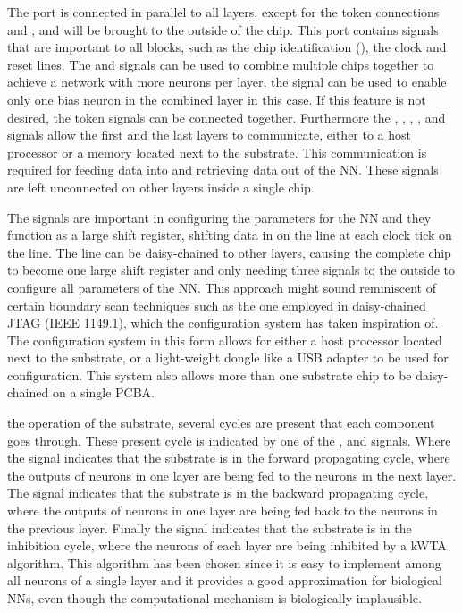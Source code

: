 The  port is connected in parallel to all layers, except for the token connections  and , and will be brought to the outside of the chip. This port contains signals that are important to all blocks, such as the chip identification (), the clock and reset lines. The  and  signals can be used to combine multiple chips together to achieve a network with more neurons per layer, the  signal can be used to enable only one bias neuron in the combined layer in this case. If this feature is not desired, the token signals can be connected together. Furthermore the , , , ,  and  signals allow the first and the last layers to communicate, either to a host processor or a memory located next to the substrate. This communication is required for feeding data into and retrieving data out of the \ac{NN}. These signals are left unconnected on other layers inside a single chip.

The  signals are important in configuring the parameters for the \ac{NN} and they function as a large shift register, shifting data in on the  line at each clock tick on the  line. The  line can be daisy-chained to other layers, causing the complete chip to become one large shift register and only needing three signals to the outside to configure all parameters of the \ac{NN}. This approach might sound reminiscent of certain boundary scan techniques such as the one employed in daisy-chained JTAG (IEEE 1149.1)\cite{718268}, which the configuration system has taken inspiration of. The configuration system in this form allows for either a host processor located next to the substrate, or a light-weight dongle like a USB adapter to be used for configuration. This system also allows more than one substrate chip to be daisy-chained on a single \ac{PCBA}.

 the operation of the substrate, several cycles are present that each component goes through. These present cycle is indicated by one of the ,  and  signals. Where the  signal indicates that the substrate is in the forward propagating cycle, where the outputs of neurons in one layer are being fed to the neurons in the next layer. The  signal indicates that the substrate is in the backward propagating cycle, where the outputs of neurons in one layer are being fed back to the neurons in the previous layer. Finally the  signal indicates that the substrate is in the inhibition cycle, where the neurons of each layer are being inhibited by a \ac{kWTA} algorithm. This algorithm has been chosen since it is easy to implement among all neurons of a single layer and it provides a good approximation for biological \acp{NN}, even though the computational mechanism is biologically implausible\cite{emergentkwta}.

